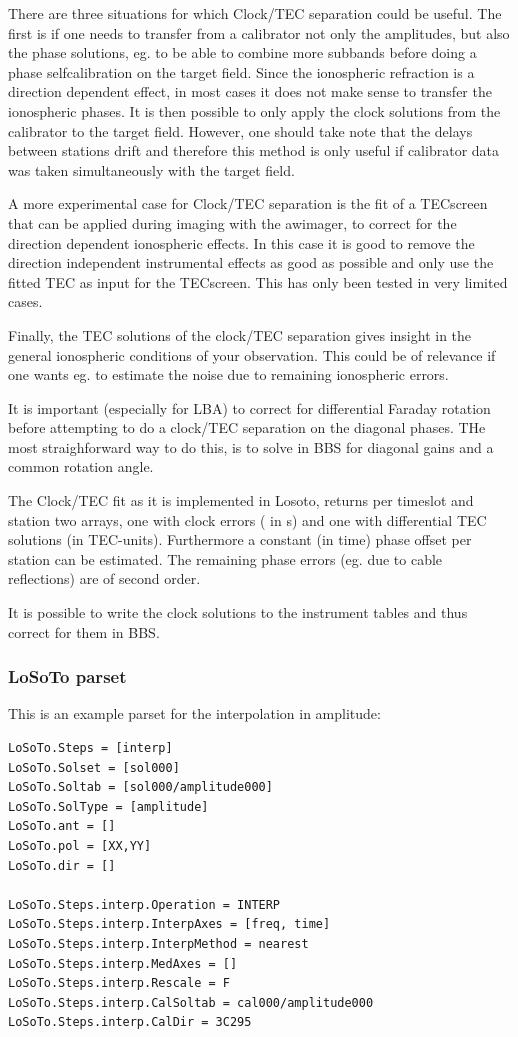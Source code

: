 \documentclass[]{article}
\begin{document}
There are three situations for which Clock/TEC separation could be useful. The
first is if one needs to transfer from a calibrator not only the
amplitudes, but also the phase solutions, eg. to be able to combine more
subbands before doing a phase selfcalibration on the target field.
Since the ionospheric refraction is
a direction dependent effect,  in most cases it does not make sense to
transfer the ionospheric phases. It is then possible to only apply the clock
solutions from the calibrator to the target field. However, one should take
note that the delays between stations drift and therefore this method is only
useful if calibrator data was taken simultaneously with the target
field. 

A more experimental case for Clock/TEC separation is the fit of a
TECscreen that can be applied during imaging with the awimager, to correct for
the direction dependent ionospheric effects. In this case it is good to remove
the direction independent instrumental effects as good as possible and only use
the fitted TEC as input for the TECscreen. This has only been tested in very
limited cases. 

Finally, the TEC solutions of the clock/TEC separation gives insight in the
general ionospheric conditions of your observation. This could be of
relevance if one wants eg. to estimate the noise due to remaining ionospheric errors.

It is important (especially for LBA) to correct for differential Faraday
rotation before attempting to do a clock/TEC separation on the diagonal
phases. THe most straighforward way to do this, is to solve in BBS for
diagonal gains and a  common rotation angle.  

The Clock/TEC fit as it is implemented in Losoto, returns per timeslot and
station two arrays, one with clock errors (
in s) and one with differential TEC solutions (in  TEC-units). Furthermore a
constant (in time) phase offset per station can be estimated. The remaining
phase errors (eg. due to cable reflections) are of second order. 

It is possible to write the clock solutions to the instrument tables and thus
correct for them in BBS. 

\subsubsection{LoSoTo parset}
\label{losoto:parset}

This is an example parset for the interpolation in amplitude:
\begin{verbatim}
LoSoTo.Steps = [interp]
LoSoTo.Solset = [sol000]
LoSoTo.Soltab = [sol000/amplitude000]
LoSoTo.SolType = [amplitude]
LoSoTo.ant = []
LoSoTo.pol = [XX,YY]
LoSoTo.dir = []

LoSoTo.Steps.interp.Operation = INTERP
LoSoTo.Steps.interp.InterpAxes = [freq, time]
LoSoTo.Steps.interp.InterpMethod = nearest
LoSoTo.Steps.interp.MedAxes = []
LoSoTo.Steps.interp.Rescale = F
LoSoTo.Steps.interp.CalSoltab = cal000/amplitude000
LoSoTo.Steps.interp.CalDir = 3C295
\end{verbatim}
\end{document}

